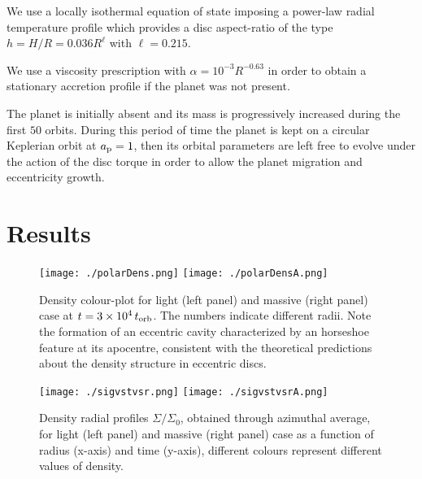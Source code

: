 \documentclass[usenatbib,a4paper,times,fleqn]{mnras}
\begin{document}
We use a locally isothermal equation of state imposing a power-law radial temperature profile which provides a disc aspect-ratio of the type $h=H/R=0.036 R^{\ell}$ with $\ell=0.215$.

We use a \citet{shakura1973} viscosity prescription with $\alpha=10^{-3} R^{-0.63}$ in order to obtain a stationary accretion profile if the planet was not present. 
  
The planet is initially absent and its mass is progressively increased during the first $50$ orbits. During this period of time the planet is kept on a circular Keplerian orbit at $a_{\rm p}=1$, then its orbital parameters are left free to evolve under the action of the disc torque in order to allow the planet migration and eccentricity growth.

\section{Results}\label{results}

\begin{figure*}
\begin{center}
\texttt{[image: ./polarDens.png]}
\texttt{[image: ./polarDensA.png]}
\caption{Density colour-plot for light (left panel) and massive (right panel) case at $t=3\times 10^4 \,t_{\rm orb}$. The numbers indicate different radii. Note the formation of an eccentric cavity characterized by an horseshoe feature at its apocentre, consistent with the theoretical predictions about the density structure in eccentric discs.}
\label{fig:denscol}
\end{center}
\end{figure*}

\begin{figure*}
\begin{center}
\texttt{[image: ./sigvstvsr.png]}
\texttt{[image: ./sigvstvsrA.png]}
\caption{Density radial profiles $\Sigma/\Sigma_0$, obtained through azimuthal average, for light (left panel) and massive (right panel) case as a function of radius (x-axis) and time (y-axis), different colours represent different values of density. }
\label{fig:denscolTIME}
\end{center}
\end{figure*}

\label{sec:results}
\end{document}
